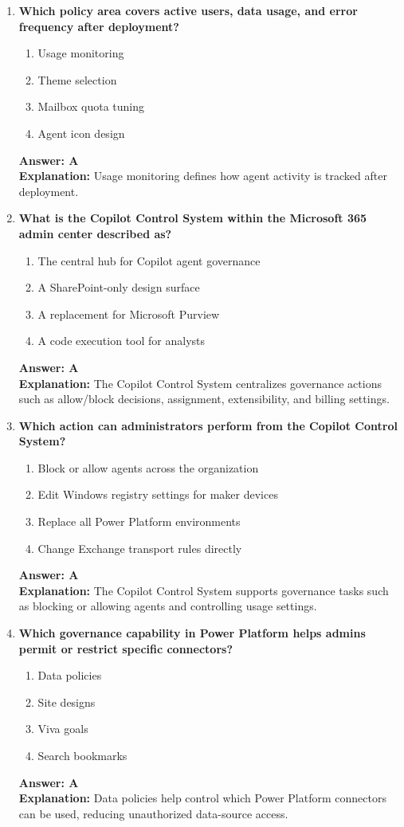 \documentclass[10pt]{article}
\begin{document}
\begin{enumerate}[leftmargin=*]
\item \textbf{Which policy area covers active users, data usage, and error frequency after deployment?}
\begin{enumerate}[label=\Alph*.]
  \item Usage monitoring
  \item Theme selection
  \item Mailbox quota tuning
  \item Agent icon design
\end{enumerate}
\textbf{Answer: A}\\
\textbf{Explanation:} Usage monitoring defines how agent activity is tracked after deployment.

\item \textbf{What is the Copilot Control System within the Microsoft 365 admin center described as?}
\begin{enumerate}[label=\Alph*.]
  \item The central hub for Copilot agent governance
  \item A SharePoint-only design surface
  \item A replacement for Microsoft Purview
  \item A code execution tool for analysts
\end{enumerate}
\textbf{Answer: A}\\
\textbf{Explanation:} The Copilot Control System centralizes governance actions such as allow/block decisions, assignment, extensibility, and billing settings.

\item \textbf{Which action can administrators perform from the Copilot Control System?}
\begin{enumerate}[label=\Alph*.]
  \item Block or allow agents across the organization
  \item Edit Windows registry settings for maker devices
  \item Replace all Power Platform environments
  \item Change Exchange transport rules directly
\end{enumerate}
\textbf{Answer: A}\\
\textbf{Explanation:} The Copilot Control System supports governance tasks such as blocking or allowing agents and controlling usage settings.

\item \textbf{Which governance capability in Power Platform helps admins permit or restrict specific connectors?}
\begin{enumerate}[label=\Alph*.]
  \item Data policies
  \item Site designs
  \item Viva goals
  \item Search bookmarks
\end{enumerate}
\textbf{Answer: A}\\
\textbf{Explanation:} Data policies help control which Power Platform connectors can be used, reducing unauthorized data-source access.


\end{enumerate}
\end{document}
